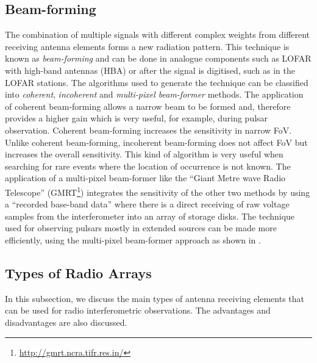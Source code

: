 %
\subsection{Beam-forming}	  	\label{chap2:Beam-forming}
%

The combination of multiple signals with different complex weights from different receiving antenna elements forms a new radiation pattern.
This technique is known as \textit{beam-forming} and can be done in analogue components such as LOFAR with high-band antennas (HBA)
or after the signal is digitised, such as in the LOFAR stations. The algorithms used to generate the technique can be classified into \textit{coherent},
\textit{incoherent} and \textit{multi-pixel beam-former} methods. The application of coherent beam-forming allows a narrow beam to be formed and, 
therefore provides a higher gain which is very useful, for example, during pulsar observation.  Coherent beam-forming increases the sensitivity in narrow FoV.
Unlike coherent beam-forming, incoherent beam-forming does not affect FoV but increases the overall sensitivity. This kind of algorithm is very useful 
when searching for rare events where the location of occurrence is not known. The application of a multi-pixel beam-former like the 
\enquote{Giant Metre wave Radio Telescope} (GMRT\footnote{\url{ http://gmrt.ncra.tifr.res.in/}}) integrates the 
sensitivity of the other two methods by using a \enquote{recorded base-band data} \citep{2012MNRAS.427L..90R} where there is a direct receiving of raw voltage samples 
from the interferometer into an array of storage disks. The technique used for observing pulsars mostly in extended sources can be made more efficiently, 
using the multi-pixel beam-former approach as shown in \cite{deng2017observing}.


% 
\subsection{Types of Radio Arrays}	  \label{chap2:sec4.3}
%
In this subsection, we discuss the main types of antenna receiving elements that can be used for radio interferometric observations. The advantages and disadvantages are also
discussed.
%

